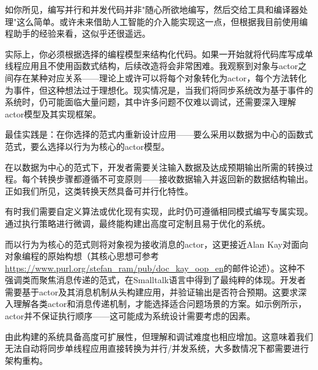 如你所见，编写并行和并发代码并非"随心所欲地编写，然后交给工具和编译器处理"这么简单。或许未来借助人工智能的介入能实现这一点，但根据我目前使用编程助手的经验来看，这似乎还很遥远。

实际上，你必须根据选择的编程模型来结构化代码。如果一开始就将代码库写成单线程应用且不使用函数式结构，后续改造将会非常困难。我观察到对象与actor之间存在某种对应关系——理论上或许可以将每个对象转化为actor，每个方法转化为事件，但这种想法过于理想化。现实情况是，当我们将同步系统改为基于事件的系统时，仍可能面临大量问题，其中许多问题不仅难以调试，还需要深入理解actor模型及其实现框架。

最佳实践是：在你选择的范式内重新设计应用——要么采用以数据为中心的函数式范式，要么选择以行为为核心的actor模型。

在以数据为中心的范式下，开发者需要关注输入数据及达成预期输出所需的转换过程。每个转换步骤都遵循不可变原则——接收数据输入并返回新的数据结构输出。正如我们所见，这类转换天然具备可并行化特性。

有时我们需要自定义算法或优化现有实现，此时仍可遵循相同模式编写专属实现。通过执行策略进行微调，最终能构建出高度可定制且易于优化的系统。

而以行为为核心的范式则将对象视为接收消息的actor，这更接近Alan Kay对面向对象编程的原始构想（其核心思想可参考\url{https://www.purl.org/stefan_ram/pub/doc_kay_oop_en}的邮件论述）。这种不强调类而聚焦消息传递的范式，在Smalltalk语言中得到了最纯粹的体现。开发者需要基于actor及其消息机制从头构建应用，并验证输出是否符合预期。这要求深入理解各类actor和消息传递机制，才能选择适合问题场景的方案。如示例所示，actor并不保证执行顺序——这可能成为系统设计需要考虑的因素。

由此构建的系统具备高度可扩展性，但理解和调试难度也相应增加。这意味着我们无法自动将同步单线程应用直接转换为并行/并发系统，大多数情况下都需要进行架构重构。